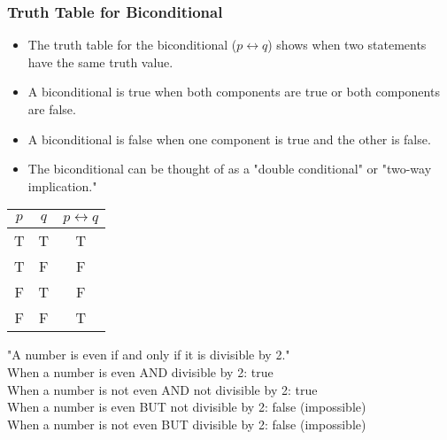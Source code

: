 \documentclass{beamer}
\begin{document}
                    \begin{frame}
                    \frametitle{Truth Table for Biconditional}
                    \begin{itemize}
                        \scriptsize
                        \item The truth table for the biconditional ($p \leftrightarrow q$) shows when two statements have the same truth value.
                        \item A biconditional is true when both components are true or both components are false.
                        \item A biconditional is false when one component is true and the other is false.
                        \item The biconditional can be thought of as a "double conditional" or "two-way implication."
                    \end{itemize}
                    
                    \begin{center}
                        \scriptsize
                    \begin{tabular}{|c|c|c|}
                    \hline
                    $p$ & $q$ & $p \leftrightarrow q$ \\
                    \hline
                    T & T & T \\
                    \hline
                    T & F & F \\
                    \hline
                    F & T & F \\
                    \hline
                    F & F & T \\
                    \hline
                    \end{tabular}
                    \end{center}
                    
                    \begin{example}
                        \scriptsize
                    "A number is even if and only if it is divisible by 2."\\
                    When a number is even AND divisible by 2: true\\
                    When a number is not even AND not divisible by 2: true\\
                    When a number is even BUT not divisible by 2: false (impossible)\\
                    When a number is not even BUT divisible by 2: false (impossible)
                    \end{example}
                    \end{frame}
\end{document}
